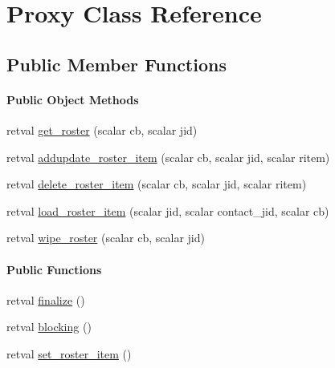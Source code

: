 \hypertarget{class_d_jabberd_1_1_roster_storage_1_1_proxy}{
\section{\-Proxy \-Class \-Reference}
\label{class_d_jabberd_1_1_roster_storage_1_1_proxy}
}
\subsection*{\-Public \-Member \-Functions}
\begin{Indent}\paragraph*{\-Public \-Object \-Methods}
\begin{DoxyCompactItemize}
\item 
retval \hyperlink{class_d_jabberd_1_1_roster_storage_1_1_proxy_aec1e6c761aae2bcc280aa799a2b4efa7}{get\-\_\-roster} (scalar cb, scalar jid)
\item 
retval \hyperlink{class_d_jabberd_1_1_roster_storage_1_1_proxy_a2e83906a1b22365c6f762dfccad56e59}{addupdate\-\_\-roster\-\_\-item} (scalar cb, scalar jid, scalar ritem)
\item 
retval \hyperlink{class_d_jabberd_1_1_roster_storage_1_1_proxy_a92ba750c7e4e9f51d02268870e872579}{delete\-\_\-roster\-\_\-item} (scalar cb, scalar jid, scalar ritem)
\item 
retval \hyperlink{class_d_jabberd_1_1_roster_storage_1_1_proxy_a635dbaaae74a1a41e9ca01d532e0a4e1}{load\-\_\-roster\-\_\-item} (scalar jid, scalar contact\-\_\-jid, scalar cb)
\item 
retval \hyperlink{class_d_jabberd_1_1_roster_storage_1_1_proxy_a6085e5097c54f3e67809d0cfe42daf73}{wipe\-\_\-roster} (scalar cb, scalar jid)
\end{DoxyCompactItemize}
\end{Indent}
\begin{Indent}\paragraph*{\-Public \-Functions}
\begin{DoxyCompactItemize}
\item 
retval \hyperlink{class_d_jabberd_1_1_roster_storage_1_1_proxy_a9bc43a22c549ad842ef7ee8d2354b670}{finalize} ()
\item 
retval \hyperlink{class_d_jabberd_1_1_roster_storage_1_1_proxy_aff20f49c411a6f3540bbefeac6b5c8b1}{blocking} ()
\item 
retval \hyperlink{class_d_jabberd_1_1_roster_storage_1_1_proxy_a4b61ab0648265745da2fa7bf8f2e1124}{set\-\_\-roster\-\_\-item} ()
\end{DoxyCompactItemize}
\end{Indent}



